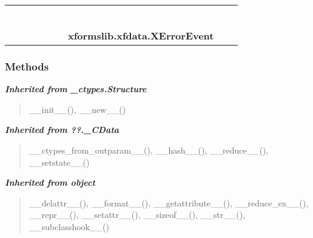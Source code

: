     \label{xformslib:xfdata:XErrorEvent}
\begin{tabular}{cccccccccc}
\multicolumn{2}{r}{\settowidth{\BCL}{object}\multirow{2}{\BCL}{object}}
&&
&&
&&
  \\\cline{3-3}
  &&\multicolumn{1}{c|}{}
&&
&&
&&
  \\
\multicolumn{4}{r}{\settowidth{\BCL}{??.\_CData}\multirow{2}{\BCL}{??.\_CData}}
&&
&&
  \\\cline{5-5}
  &&&&\multicolumn{1}{c|}{}
&&
&&
  \\
\multicolumn{6}{r}{\settowidth{\BCL}{\_ctypes.Structure}\multirow{2}{\BCL}{\_ctypes.Structure}}
&&
  \\\cline{7-7}
  &&&&&&\multicolumn{1}{c|}{}
&&
  \\
&&&&&&\multicolumn{2}{l}{\textbf{xformslib.xfdata.XErrorEvent}}
\end{tabular}



  \subsubsection{Methods}


\large{\textbf{\textit{Inherited from \_ctypes.Structure}}}

\begin{quote}
\_\_init\_\_(), \_\_new\_\_()
\end{quote}

\large{\textbf{\textit{Inherited from ??.\_CData}}}

\begin{quote}
\_\_ctypes\_from\_outparam\_\_(), \_\_hash\_\_(), \_\_reduce\_\_(), \_\_setstate\_\_()
\end{quote}

\large{\textbf{\textit{Inherited from object}}}

\begin{quote}
\_\_delattr\_\_(), \_\_format\_\_(), \_\_getattribute\_\_(), \_\_reduce\_ex\_\_(), \_\_repr\_\_(), \_\_setattr\_\_(), \_\_sizeof\_\_(), \_\_str\_\_(), \_\_subclasshook\_\_()
\end{quote}


